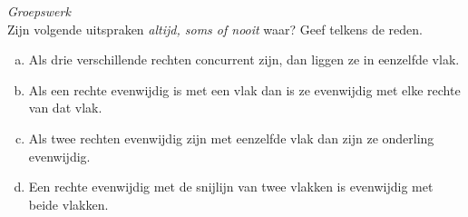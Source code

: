 \documentclass[12pt,twoside]{article}
\begin{document}
\begin{oefening} {\em Groepswerk}\\
Zijn volgende uitspraken {\em altijd, soms of nooit} waar? Geef telkens de reden.
\begin{enumerate}[(a)]
  \item Als drie verschillende rechten concurrent zijn, dan liggen ze in eenzelfde vlak.
  \item Als een rechte evenwijdig is met een vlak dan is ze evenwijdig met elke rechte van dat vlak.
  \item Als twee rechten evenwijdig zijn met eenzelfde vlak dan zijn ze onderling evenwijdig.
  \item Een rechte evenwijdig met de snijlijn van twee vlakken is evenwijdig met beide vlakken.
\end{enumerate}
\end{oefening}
\end{document}
